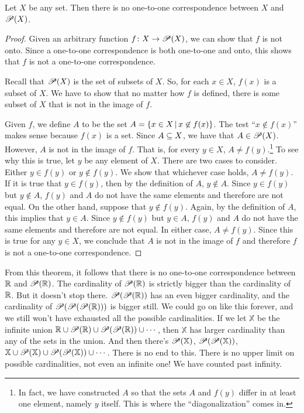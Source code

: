 \begin{theorem}\label{T-cardinality}
Let $X$ be any set.  Then there is no one-to-one correspondence
between $X$ and ${\mathscr P}(X)$.
\end{theorem}
\begin{proof}
Given an arbitrary function $f\colon X\to {\mathscr P}(X)$, we can show that
$f$ is not onto.  Since a one-to-one correspondence is both
one-to-one and onto, this shows that $f$ is not a one-to-one
correspondence.

Recall that ${\mathscr P}(X)$ is the set of subsets of $X$.  So, for
each $x\in X$, $f(x)$ is a subset of $X$.  We have to show that
no matter how $f$ is defined, there is some subset of $X$ that
is not in the image of $f$.

Given $f$, we define $A$ to be the set $A=\{x\in X\,|\, x\not\in f(x)\}$.
The test ``$x\not\in f(x)$'' makes sense because $f(x)$ is a set.
Since $A\subseteq X$, we have that $A\in{\mathscr P}(X)$.  However, $A$ is not in the image
of $f$.  That is, for every $y\in X$, $A\not=f(y)$.\footnote{In fact, we have
constructed $A$ so that the sets $A$ and $f(y)$ differ in at least
one element, namely $y$ itself.  
This is where the ``diagonalization'' comes in.}
To see why this
is true, let $y$ be any element of $X$.  There are two cases
to consider.  Either $y\in f(y)$ or $y\not\in f(y)$.  We show that
whichever case holds, $A\not=f(y)$.  If it is true that $y\in f(y)$,
then by the definition of $A$, $y\not\in A$.  Since $y\in f(y)$ but
$y\not\in A$, $f(y)$ and $A$ do not have the same elements and 
therefore are not equal.  On the other hand, suppose that
$y\not\in f(y)$.  Again, by the definition of $A$, this implies that
$y\in A$.  Since $y\not\in f(y)$ but $y\in A$, $f(y)$ and $A$ do not 
have the same elements and therefore are not equal.  In either
case, $A\not=f(y)$.  Since this is true for any $y\in X$,
we conclude that $A$ is not in the image of $f$ and therefore
$f$ is not a one-to-one correspondence.
\end{proof}


From this theorem, it follows that there is no one-to-one
correspondence between ${\mathbb R}$ and ${\mathscr P}({\mathbb R})$.  The cardinality of ${\mathscr P}({\mathbb R})$
is strictly bigger than the cardinality of~${\mathbb R}$. But it doesn't 
stop there.  ${\mathscr P}({\mathscr P}({\mathbb R}))$ has an even bigger cardinality,
and the cardinality of ${\mathscr P}({\mathscr P}({\mathscr P}({\mathbb R})))$ is bigger still.
We could go on like this forever, and we still won't have exhausted
all the possible cardinalities.  If we let ${\mathbb X}$ be the infinite
union ${\mathbb R}\cup{\mathscr P}({\mathbb R})\cup{\mathscr P}({\mathscr P}({\mathbb R}))\cup\cdots$, then ${\mathbb X}$
has larger cardinality than any of the sets in the union.
And then there's ${\mathscr P}({\mathbb X})$, ${\mathscr P}({\mathscr P}({\mathbb X}))$, ${\mathbb X}\cup{\mathscr P}({\mathbb X})\cup
{\mathscr P}({\mathscr P}({\mathbb X}))\cup\cdots$.  There is no end to this.
There is no upper limit on possible cardinalities, not even an infinite
one!  We have counted past infinity.

